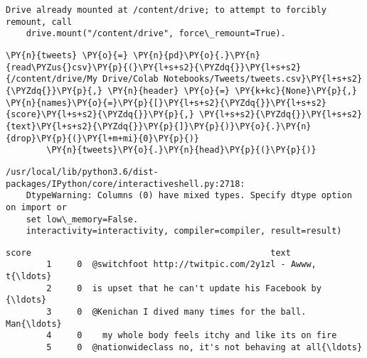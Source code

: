 \begin{Verbatim}[commandchars=\\\{\}]
    Drive already mounted at /content/drive; to attempt to forcibly remount, call
    drive.mount("/content/drive", force\_remount=True).
\end{Verbatim}

\begin{tcolorbox}[breakable, size=fbox, boxrule=1pt, pad at break*=1mm,colback=cellbackground, colframe=cellborder]
    \begin{Verbatim}[commandchars=\\\{\}]
        \PY{n}{tweets} \PY{o}{=} \PY{n}{pd}\PY{o}{.}\PY{n}{read\PYZus{}csv}\PY{p}{(}\PY{l+s+s2}{\PYZdq{}}\PY{l+s+s2}{/content/drive/My Drive/Colab Notebooks/Tweets/tweets.csv}\PY{l+s+s2}{\PYZdq{}}\PY{p}{,} \PY{n}{header} \PY{o}{=} \PY{k+kc}{None}\PY{p}{,} \PY{n}{names}\PY{o}{=}\PY{p}{[}\PY{l+s+s2}{\PYZdq{}}\PY{l+s+s2}{score}\PY{l+s+s2}{\PYZdq{}}\PY{p}{,} \PY{l+s+s2}{\PYZdq{}}\PY{l+s+s2}{text}\PY{l+s+s2}{\PYZdq{}}\PY{p}{]}\PY{p}{)}\PY{o}{.}\PY{n}{drop}\PY{p}{(}\PY{l+m+mi}{0}\PY{p}{)}
        \PY{n}{tweets}\PY{o}{.}\PY{n}{head}\PY{p}{(}\PY{p}{)}
    \end{Verbatim}
\end{tcolorbox}

\begin{Verbatim}[commandchars=\\\{\}]
    /usr/local/lib/python3.6/dist-packages/IPython/core/interactiveshell.py:2718:
    DtypeWarning: Columns (0) have mixed types. Specify dtype option on import or
    set low\_memory=False.
    interactivity=interactivity, compiler=compiler, result=result)
\end{Verbatim}

\begin{tcolorbox}[breakable, size=fbox, boxrule=.5pt, pad at break*=1mm, opacityfill=0]
    \begin{Verbatim}[commandchars=\\\{\}]
        score                                               text
        1     0  @switchfoot http://twitpic.com/2y1zl - Awww, t{\ldots}
        2     0  is upset that he can't update his Facebook by {\ldots}
        3     0  @Kenichan I dived many times for the ball. Man{\ldots}
        4     0    my whole body feels itchy and like its on fire
        5     0  @nationwideclass no, it's not behaving at all{\ldots}
    \end{Verbatim}
\end{tcolorbox}


